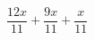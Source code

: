 \begin{ex}
	\begin{condition}
		\( \dfrac{12x}{11}+\dfrac{9x}{11}+\dfrac{x}{11} \)
	\end{condition}
\end{ex}